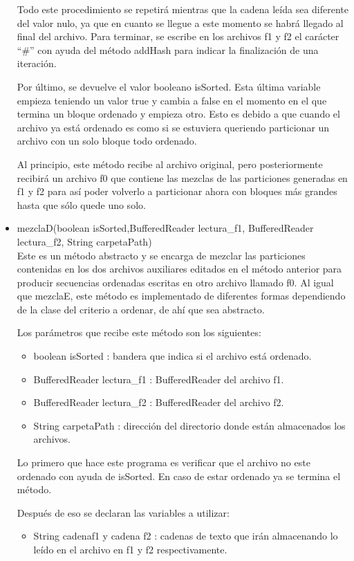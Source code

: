\documentclass[11pt]{article}
\begin{document}
\begin{itemize}
\par 
Todo este procedimiento se repetirá mientras que la cadena leída sea diferente del valor nulo, ya que en cuanto se llegue a este momento se habrá llegado al final del archivo.
Para terminar, se escribe en los archivos f1 y f2 el carácter “\#” con ayuda del método addHash para indicar la finalización de una iteración.
\par 
Por último, se devuelve el valor booleano isSorted. Esta última variable empieza teniendo un valor true y cambia a false en el momento en el que termina un bloque ordenado y empieza otro. Esto es debido a que cuando el archivo ya está ordenado es como si se estuviera queriendo particionar un archivo con un solo bloque todo ordenado.
\par 
Al principio, este método recibe al archivo original, pero posteriormente recibirá un archivo f0 que contiene las mezclas de las particiones generadas en f1 y f2 para así poder volverlo a particionar ahora con bloques más grandes hasta que sólo quede uno solo.
\item mezclaD(boolean isSorted,BufferedReader lectura\_f1, BufferedReader lectura\_f2, String carpetaPath) \\
Este es un método abstracto y se encarga de mezclar las particiones contenidas en los dos archivos auxiliares editados en el método anterior para producir secuencias ordenadas escritas en otro archivo llamado f0. Al igual que mezclaE, este método es implementado de diferentes formas dependiendo de la clase del criterio a ordenar, de ahí que sea abstracto.
\par 
Los parámetros que recibe este método son los siguientes:
\begin{itemize}
\item boolean isSorted : bandera que indica si el archivo está ordenado.
\item BufferedReader lectura\_f1 : BufferedReader del archivo f1.
\item BufferedReader lectura\_f2 : BufferedReader del archivo f2.
\item String carpetaPath : dirección del directorio donde están almacenados los archivos.
\end{itemize}
Lo primero que hace este programa es verificar que el archivo no este ordenado con ayuda de isSorted. En caso de estar ordenado ya se termina el método. 
\par 
Después de eso se declaran las variables a utilizar:
\begin{itemize}
\item String cadenaf1 y cadena f2 : cadenas de texto que irán almacenando lo leído en el archivo en f1 y f2 respectivamente.

\end{itemize}
\end{itemize}
\end{document}
